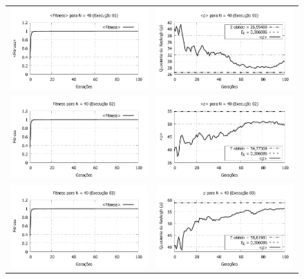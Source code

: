\begin{figure}[phtb]
\centering
  \begin{tabular}{@{}cc@{}}
    \includegraphics[width=.40\textwidth]{figs/resultados/fitnessGrad/N40_01_fitness.pdf} &
    \includegraphics[width=.40\textwidth]{figs/resultados/fitnessGrad/N40_01_rho.pdf}   \\
		\includegraphics[width=.40\textwidth]{figs/resultados/fitnessGrad/N40_02_fitness.pdf} &
    \includegraphics[width=.40\textwidth]{figs/resultados/fitnessGrad/N40_02_rho.pdf}   \\
		\includegraphics[width=.40\textwidth]{figs/resultados/fitnessGrad/N40_03_fitness.pdf} &
    \includegraphics[width=.40\textwidth]{figs/resultados/fitnessGrad/N40_03_rho.pdf}   \\

\end{tabular}
\end{figure}
